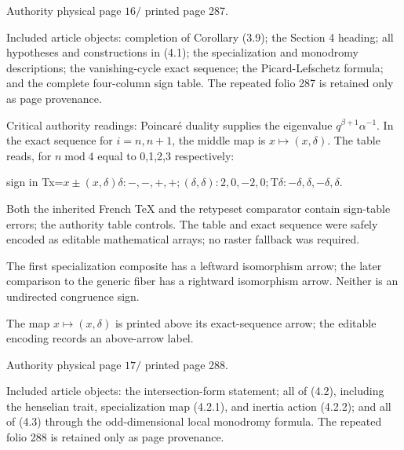 \documentclass[10pt,leqno]{article}
\begin{document}
\noindent Authority physical page \(16 /\) printed page 287.\par

\noindent Included article objects: completion of Corollary (3.9); the Section 4 heading; all hypotheses and constructions in (4.1); the specialization and monodromy descriptions; the vanishing-cycle exact sequence; the Picard-Lefschetz formula; and the complete four-column sign table. The repeated folio 287 is retained only as page provenance.\par

\noindent Critical authority readings: Poincaré duality supplies the eigenvalue \(q^{\beta +1}\alpha ^{- 1}\). In the exact sequence for \(i=n,n+1\), the middle map is \(x\longmapsto (x,\delta )\). The table reads, for \(n \operatorname{mod} 4\) equal to 0,1,2,3 respectively:\par

\noindent sign in Tx=\(x\pm (x,\delta )\delta : - ,- ,+,+; (\delta ,\delta ): 2,0,- 2,0; \mathrm{T}\delta : - \delta ,\delta ,- \delta ,\delta \).\par

\noindent Both the inherited French TeX and the retypeset comparator contain sign-table errors; the authority table controls. The table and exact sequence were safely encoded as editable mathematical arrays; no raster fallback was required.\par

\noindent The first specialization composite has a leftward isomorphism arrow; the later comparison to the generic fiber has a rightward isomorphism arrow. Neither is an undirected congruence sign.\par

\noindent The map \(x\longmapsto (x,\delta )\) is printed above its exact-sequence arrow; the editable encoding records an above-arrow label.\par

\clearpage

\label{physical-17}\par\smallskip

\noindent Authority physical page \(17 /\) printed page 288.\par

\noindent Included article objects: the intersection-form statement; all of (4.2), including the henselian trait, specialization map (4.2.1), and inertia action (4.2.2); and all of (4.3) through the odd-dimensional local monodromy formula. The repeated folio 288 is retained only as page provenance.\par
\end{document}
